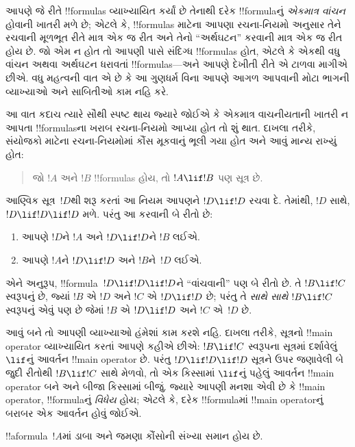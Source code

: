 \documentclass[../../../include/open-logic-section]{subfiles}
\begin{document}


\begin{explain}
આપણે જે રીતે !!{formula}s વ્યાખ્યાયિત કર્યાં છે તેનાથી દરેક
!!{formula}નું \emph{એકમાત્ર વાંચન} હોવાની ખાતરી મળે છે; એટલે કે,
!!{formula}s માટેના આપણા રચના-નિયમો અનુસાર તેને રચવાની મૂળભૂત રીતે
માત્ર એક જ રીત અને તેનો ``અર્થઘટન'' કરવાની માત્ર એક જ રીત હોય છે. જો
એમ ન હોત તો આપણી પાસે સંદિગ્ધ !!{formula}s હોત, એટલે કે એકથી વધુ
વાંચન અથવા અર્થઘટન ધરાવતાં !!{formula}s---અને આપણે દેખીતી રીતે એ
ટાળવા માગીએ છીએ. વધુ મહત્વની વાત એ છે કે આ ગુણધર્મ વિના આપણે આગળ
આપવાની મોટા ભાગની વ્યાખ્યાઓ અને સાબિતીઓ કામ નહિ કરે.

આ વાત કદાચ ત્યારે સૌથી સ્પષ્ટ થાય જ્યારે જોઈએ કે એકમાત્ર વાચનીયતાની
ખાતરી ન આપતા !!{formula}sના ખરાબ રચના-નિયમો આપ્યા હોત તો શું થાત.
દાખલા તરીકે, સંયોજકો માટેના રચના-નિયમોમાં કૌંસ મૂકવાનું ભૂલી ગયા હોત
અને આવું માન્ય રાખ્યું હોત:
\begin{quote}
જો $!A$ અને $!B$ !!{formula}s હોય, તો $!A \lif !B$ પણ સૂત્ર છે.
\end{quote}
આણ્વિક સૂત્ર~$!D$થી શરૂ કરતાં આ નિયમ આપણને $!D\lif !D$ રચવા દે.
તેમાંથી, $!D$ સાથે, $!D\lif !D\lif !D$ મળે. પરંતુ આ કરવાની બે રીતો છે:
\begin{enumerate}
\item આપણે $!D$ને $!A$ અને $!D\lif !D$ને $!B$ લઈએ.
\item આપણે $!A$ને $!D\lif !D$ અને $!B$ને~$!D$ લઈએ.
\end{enumerate}
એને અનુરૂપ, !!{formula}~$!D\lif !D\lif !D$ને ``વાંચવાની'' પણ બે રીતો
છે. તે $!B\lif !C$ સ્વરૂપનું છે, જ્યાં $!B$ એ $!D$ અને $!C$ એ
$!D\lif !D$ છે; પરંતુ તે \emph{સાથે સાથે} $!B\lif !C$ સ્વરૂપનું એવું
પણ છે જેમાં $!B$ એ $!D\lif !D$ અને $!C$ એ~$!D$ છે.

આવું બને તો આપણી વ્યાખ્યાઓ હંમેશાં કામ કરશે નહિ. દાખલા તરીકે,
સૂત્રનો !!{main operator} વ્યાખ્યાયિત કરતાં આપણે કહીએ છીએ:
$!B\lif !C$ સ્વરૂપના સૂત્રમાં દર્શાવેલું~$\lif$નું આવર્તન
!!{main operator} છે. પરંતુ $!D\lif !D\lif !D$ સૂત્રને ઉપર જણાવેલી બે
જુદી રીતોથી $!B\lif !C$ સાથે મેળવો, તો એક કિસ્સામાં $\lif$નું પહેલું
આવર્તન !!{main operator} બને અને બીજા કિસ્સામાં બીજું. જ્યારે આપણી
મનશા એવી છે કે !!{main operator}, !!{formula}નું \emph{વિધેય}
હોય; એટલે કે, દરેક !!{formula}માં !!{main
  operator}નું બરાબર એક
આવર્તન હોવું જોઈએ.
\end{explain}

\begin{lem}
!!a{formula}~$!A$માં ડાબા અને જમણા કૌંસોની સંખ્યા સમાન હોય છે.
\end{lem}
\end{document}
